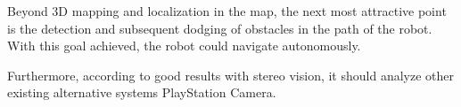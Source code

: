 

Beyond 3D mapping and localization in the map, the next most attractive point is
the detection and subsequent dodging of obstacles in the path of the robot. With
this goal achieved, the robot could navigate autonomously.

Furthermore, according to good results with stereo vision, it should analyze
other existing alternative systems PlayStation Camera.

